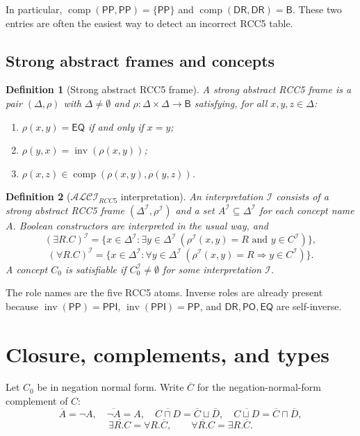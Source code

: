 \documentclass[11pt]{article}
\newtheorem{definition}{Definition}[section]
\theoremstyle{remark}
\newcommand{\Logic}{\mathcal{ALCI}_{RCC5}}
\newcommand{\Base}{\mathsf{B}}
\newcommand{\DR}{\mathsf{DR}}
\newcommand{\PO}{\mathsf{PO}}
\newcommand{\PP}{\mathsf{PP}}
\newcommand{\PPI}{\mathsf{PPI}}
\newcommand{\EQ}{\mathsf{EQ}}
\newcommand{\Inv}{\operatorname{inv}}
\newcommand{\comp}{\operatorname{comp}}
\newcommand{\I}{\mathcal{I}}
\begin{document}
In particular, $\comp(\PP,\PP)=\{\PP\}$ and $\comp(\DR,\DR)=\Base$.  These two entries are often the easiest way to detect an incorrect RCC5 table.

\subsection{Strong abstract frames and concepts}
\begin{definition}[Strong abstract RCC5 frame]
A strong abstract RCC5 frame is a pair $(\Delta,\rho)$ with $\Delta\ne\emptyset$ and $\rho:\Delta\times\Delta\to\Base$ satisfying, for all $x,y,z\in\Delta$:
\begin{enumerate}[label=(F\arabic*)]
\item $\rho(x,y)=\EQ$ if and only if $x=y$;
\item $\rho(y,x)=\Inv(\rho(x,y))$;
\item $\rho(x,z)\in\comp(\rho(x,y),\rho(y,z))$.
\end{enumerate}
\end{definition}

\begin{definition}[$\Logic$ interpretation]
An interpretation $\I$ consists of a strong abstract RCC5 frame $(\Delta^\I,\rho^\I)$ and a set $A^\I\subseteq\Delta^\I$ for each concept name $A$.  Boolean constructors are interpreted in the usual way, and
\[
(\exists R.C)^\I=\{x\in\Delta^\I: \exists y\in\Delta^\I\ (\rho^\I(x,y)=R\text{ and }y\in C^\I)\},
\]
\[
(\forall R.C)^\I=\{x\in\Delta^\I: \forall y\in\Delta^\I\ (\rho^\I(x,y)=R\Rightarrow y\in C^\I)\}.
\]
A concept $C_0$ is satisfiable if $C_0^\I\ne\emptyset$ for some interpretation $\I$.
\end{definition}

The role names are the five RCC5 atoms.  Inverse roles are already present because $\Inv(\PP)=\PPI$, $\Inv(\PPI)=\PP$, and $\DR,\PO,\EQ$ are self-inverse.

\section{Closure, complements, and types}
Let $C_0$ be in negation normal form.  Write $\overline{C}$ for the negation-normal-form complement of $C$:
\[
\overline{A}=\neg A,
\quad \overline{\neg A}=A,
\quad \overline{C\sqcap D}=\overline C\sqcup\overline D,
\quad \overline{C\sqcup D}=\overline C\sqcap\overline D,
\]
\[
\overline{\exists R.C}=\forall R.\overline C,
\qquad
\overline{\forall R.C}=\exists R.\overline C.
\]
\end{document}
